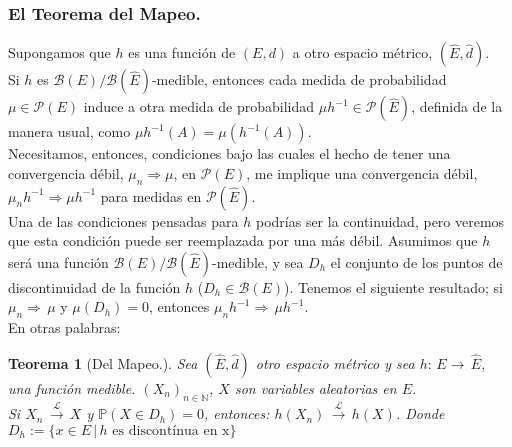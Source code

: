 \documentclass[a4paper]{article}
\newtheorem{teorema}{Teorema}
\numberwithin{equation}{subsection}
\def\N{\mathbb N}
\newcommand{\pb}{\mathbb{P}}
\begin{document}
\subsubsection{El Teorema del Mapeo.}
Supongamos que $h$ es una función de $(E,d)$ a otro espacio métrico, $(\hat{E},\hat{d})$. \\Si $h$ es $\mathcal{B}(E)/\mathcal{B}(\hat{E})$-medible, entonces cada medida de probabilidad $\mu \in \mathcal{P}(E)$ induce a otra medida de probabilidad $\mu h^{-1} \in \mathcal{P}(\hat{E})$, definida de la manera usual, como $\mu h^{-1}(A) = \mu(h^{-1}(A))$. \\ \newline
Necesitamos, entonces, condiciones bajo las cuales el hecho de tener una convergencia débil, $\mu_n \Rightarrow \mu$, en $\mathcal{P}(E)$, me implique una convergencia débil, $\mu_nh^{-1} \Rightarrow \mu h^{-1}$ para medidas en $\mathcal{P}(\hat{E})$. \\ \newline
Una de las condiciones pensadas para $h$ podrías ser la continuidad, pero veremos que esta condición puede ser reemplazada por una más débil. Asumimos que $h$ será una función $\mathcal{B}(E)/\mathcal{B}(\hat{E})$-medible, y sea $D_h$ el conjunto de los puntos de discontinuidad de la función $h$ ($D_h \in \mathcal{B}(E)$). Tenemos el siguiente resultado;  si $\mu_n \Rightarrow\,\mu$ y $\mu(D_h) = 0$, entonces $\mu_n h^{-1} \Rightarrow\, \mu h^{-1}$. \\ \newline
En otras palabras:

\begin{teorema}[Del Mapeo.] Sea $(\hat{E},\hat{d})$ otro espacio métrico y sea $h:\,E\rightarrow\,\hat{E}$, una función medible. $(X_n)_{n\in\N}$, $X$ son variables aleatorias en $E$.\\ \newline
Si $X_n\,\xrightarrow{\mathcal{L}}\,X$ y $\pb(X \in D_h) = 0$, entonces: $h(X_n) \,\xrightarrow{\mathcal{L}}\,h(X)$. Donde $D_h :=\{x\in E\,|\,\text{$h$ es discontínua en x}\}$
\end{teorema}
\end{document}

